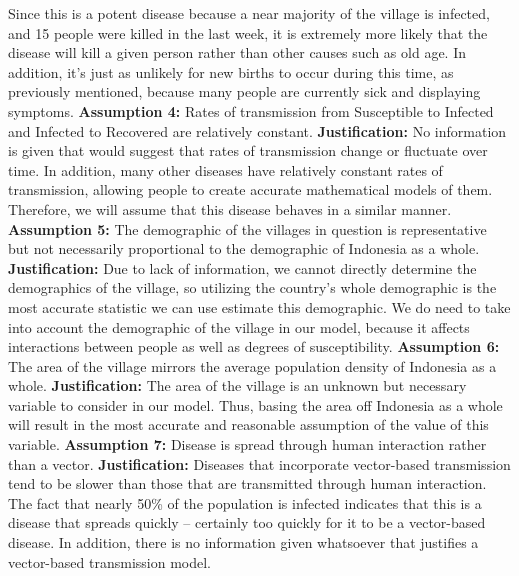 \documentclass[12pt]{article}
\begin{document}
Since this is a potent disease because a near majority of the village is infected, and 15 people were killed in the last week, it is extremely more likely that the disease will kill a given person rather than other causes such as old age. In addition, it’s just as unlikely for new births to occur during this time, as previously mentioned, because many people are currently sick and displaying symptoms.
\newline
\newline
\textbf{Assumption 4:} Rates of transmission from Susceptible to Infected and Infected to Recovered are relatively constant.
\newline
\textbf{Justification:} No information is given that would suggest that rates of transmission change or fluctuate over time. In addition, many other diseases have relatively constant rates of transmission, allowing people to create accurate mathematical models of them. Therefore, we will assume that this disease behaves in a similar manner.
\newline
\newline
\textbf{Assumption 5:} The demographic of the villages in question is representative but not necessarily proportional to the demographic of Indonesia as a whole.
\newline
\textbf{Justification:} Due to lack of information, we cannot directly determine the demographics of the village, so utilizing the country’s whole demographic is the most accurate statistic we can use estimate this demographic. We do need to take into account the demographic of the village in our model, because it affects interactions between people as well as degrees of susceptibility.
\newline
\newline
\textbf{Assumption 6:} The area of the village mirrors the average population density of Indonesia as a whole.
\newline
\textbf{Justification:} The area of the village is an unknown but necessary variable to consider in our model. Thus, basing the area off Indonesia as a whole will result in the most accurate and reasonable assumption of the value of this variable.
\newline
\newline
\textbf{Assumption 7:} Disease is spread through human interaction rather than a vector.
\newline
\textbf{Justification:} Diseases that incorporate vector-based transmission tend to be slower than those that are transmitted through human interaction. The fact that nearly 50\% of the population is infected indicates that this is a disease that spreads quickly -- certainly too quickly for it to be a vector-based disease. In addition, there is no information given whatsoever that justifies a vector-based transmission model.
\end{document}
